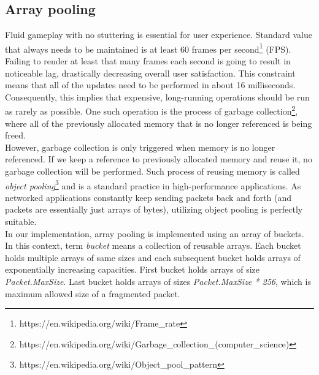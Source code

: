 \documentclass[times, utf8, diplomski]{fer}
\begin{document}
\subsection{Array pooling}
Fluid gameplay with no stuttering is essential for user experience. Standard value that always needs to be maintained is at least 60 frames per second\footnote{https://en.wikipedia.org/wiki/Frame\_rate} (FPS). Failing to render at least that many frames each second is going to result in noticeable lag, drastically decreasing overall user satisfaction. This constraint means that all of the updates need to be performed in about 16 milliseconds. Consequently, this implies that expensive, long-running operations should be run as rarely as possible. One such operation is the process of garbage collection\footnote{https://en.wikipedia.org/wiki/Garbage\_collection\_(computer\_science)}, where all of the previously allocated memory that is no longer referenced is being freed.\\

However, garbage collection is only triggered when memory is no longer referenced. If we keep a reference to previously allocated memory and reuse it, no garbage collection will be performed. Such process of reusing memory is called \textit{object pooling}\footnote{https://en.wikipedia.org/wiki/Object\_pool\_pattern} and is a standard practice in high-performance applications. As networked applications constantly keep sending packets back and forth (and packets are essentially just arrays of bytes), utilizing object pooling is perfectly suitable.\\

In our implementation, array pooling is implemented using an array of buckets. In this context, term \textit{bucket} means a collection of reusable arrays. Each bucket holds multiple arrays of same sizes and each subsequent bucket holds arrays of exponentially increasing capacities. First bucket holds arrays of size \textit{Packet.MaxSize}. Last bucket holds arrays of sizes \textit{Packet.MaxSize * 256}, which is maximum allowed size of a fragmented packet.
\end{document}
